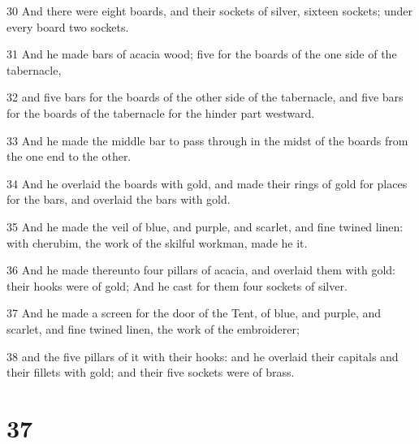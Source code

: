 \par 30 And there were eight boards, and their sockets of silver, sixteen sockets; under every board two sockets.
\par 31 And he made bars of acacia wood; five for the boards of the one side of the tabernacle,
\par 32 and five bars for the boards of the other side of the tabernacle, and five bars for the boards of the tabernacle for the hinder part westward.
\par 33 And he made the middle bar to pass through in the midst of the boards from the one end to the other.
\par 34 And he overlaid the boards with gold, and made their rings of gold for places for the bars, and overlaid the bars with gold.
\par 35 And he made the veil of blue, and purple, and scarlet, and fine twined linen: with cherubim, the work of the skilful workman, made he it.
\par 36 And he made thereunto four pillars of acacia, and overlaid them with gold: their hooks were of gold; And he cast for them four sockets of silver.
\par 37 And he made a screen for the door of the Tent, of blue, and purple, and scarlet, and fine twined linen, the work of the embroiderer;
\par 38 and the five pillars of it with their hooks: and he overlaid their capitals and their fillets with gold; and their five sockets were of brass.

\chapter{37}


